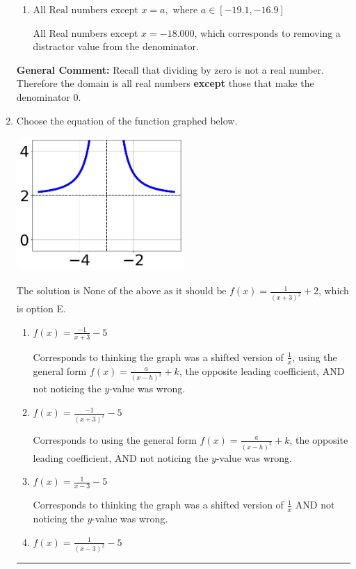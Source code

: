 \documentclass{extbook}[14pt]
\newcommand{\litem}[1]{\item #1

\rule{\textwidth}{0.4pt}}
\begin{document}
\begin{enumerate}
{\begin{enumerate}[label=\Alph*.]
All Real numbers except $x = -18.000$ and $x = 9.000$, which corresponds to not factoring the denominator correctly.
\item \( \text{All Real numbers except } x = a, \text{ where } a \in [-19.1, -16.9] \)

All Real numbers except $x = -18.000$, which corresponds to removing a distractor value from the denominator.
\end{enumerate}

\textbf{General Comment:} Recall that dividing by zero is not a real number. Therefore the domain is all real numbers \textbf{except} those that make the denominator 0.
}
\litem{
Choose the equation of the function graphed below.

\begin{center}
    \includegraphics[width=0.5\textwidth]{../Figures/rationalGraphToEquationCopyB.png}
\end{center}


The solution is \( \text{None of the above as it should be } f(x) = \frac{1}{(x + 3)^2} + 2 \), which is option E.\begin{enumerate}[label=\Alph*.]
\item \( f(x) = \frac{-1}{x + 3} - 5 \)

Corresponds to thinking the graph was a shifted version of $\frac{1}{x}$, using the general form $f(x) = \frac{a}{(x-h)^2}+k$, the opposite leading coefficient, AND not noticing the $y$-value was wrong.
\item \( f(x) = \frac{-1}{(x + 3)^2} - 5 \)

Corresponds to using the general form $f(x) = \frac{a}{(x-h)^2}+k$, the opposite leading coefficient, AND not noticing the $y$-value was wrong.
\item \( f(x) = \frac{1}{x - 3} - 5 \)

Corresponds to thinking the graph was a shifted version of $\frac{1}{x}$ AND not noticing the $y$-value was wrong.
\item \( f(x) = \frac{1}{(x - 3)^2} - 5 \)


\end{enumerate}}
\end{enumerate}
\end{document}
